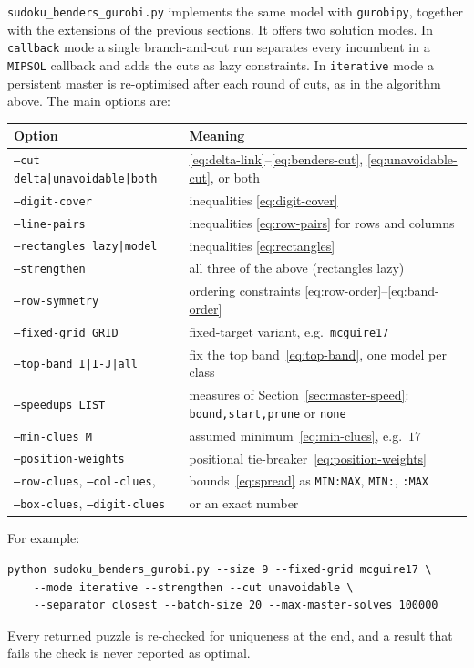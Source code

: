\documentclass[11pt]{article}
\begin{document}
\texttt{sudoku\_benders\_gurobi.py} implements the same model with \texttt{gurobipy}, together with the extensions of the previous sections. It offers two solution modes. In \texttt{callback} mode a single branch-and-cut run separates every incumbent in a \texttt{MIPSOL} callback and adds the cuts as lazy constraints. In \texttt{iterative} mode a persistent master is re-optimised after each round of cuts, as in the algorithm above. The main options are:
\begin{center}
\begin{tabular}{ll}
\toprule
Option & Meaning\\
\midrule
\texttt{--cut delta|unavoidable|both} & \eqref{eq:delta-link}--\eqref{eq:benders-cut}, \eqref{eq:unavoidable-cut}, or both\\
\texttt{--digit-cover} & inequalities \eqref{eq:digit-cover}\\
\texttt{--line-pairs} & inequalities \eqref{eq:row-pairs} for rows and columns\\
\texttt{--rectangles lazy|model} & inequalities \eqref{eq:rectangles}\\
\texttt{--strengthen} & all three of the above (rectangles lazy)\\
\texttt{--row-symmetry} & ordering constraints \eqref{eq:row-order}--\eqref{eq:band-order}\\
\texttt{--fixed-grid GRID} & fixed-target variant, e.g.\ \texttt{mcguire17}\\
\texttt{--top-band I|I-J|all} & fix the top band~\eqref{eq:top-band}, one model per class\\
\texttt{--speedups LIST} & measures of Section~\ref{sec:master-speed}: \texttt{bound,start,prune} or \texttt{none}\\
\texttt{--min-clues M} & assumed minimum~\eqref{eq:min-clues}, e.g.\ $17$\\
\texttt{--position-weights} & positional tie-breaker~\eqref{eq:position-weights}\\
\texttt{--row-clues}, \texttt{--col-clues}, & bounds~\eqref{eq:spread} as \texttt{MIN:MAX}, \texttt{MIN:}, \texttt{:MAX}\\
\texttt{--box-clues}, \texttt{--digit-clues} & or an exact number\\
\bottomrule
\end{tabular}
\end{center}
For example:
\begin{verbatim}
python sudoku_benders_gurobi.py --size 9 --fixed-grid mcguire17 \
    --mode iterative --strengthen --cut unavoidable \
    --separator closest --batch-size 20 --max-master-solves 100000
\end{verbatim}
Every returned puzzle is re-checked for uniqueness at the end, and a result that fails the check is never reported as optimal.
\end{document}
